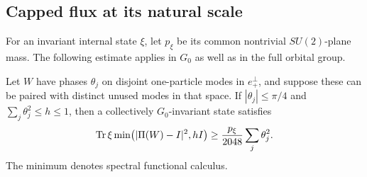 \subsection{Capped flux at its natural scale}

For an invariant internal state $\xi$, let $p_\xi$ be its common
nontrivial $SU(2)$-plane mass. The following estimate applies in
$G_0$ as well as in the full orbital group.
\begin{lemma}\label{lem:capped-invariant-flux}
Let $W$ have phases $\theta_j$ on disjoint one-particle modes in
$e_+^\perp$, and suppose these can be paired with distinct unused
modes in that space. If $|\theta_j|\leq\pi/4$ and
$\sum_j\theta_j^2\leq h\leq1$, then a collectively $G_0$-invariant
state satisfies
\[
 \operatorname{Tr}\xi\min\bigl(|\Pi(W)-I|^2,hI\bigr)
       \geq\frac{p_\xi}{2048}\sum_j\theta_j^2.
\]
The minimum denotes spectral functional calculus.
\end{lemma}
